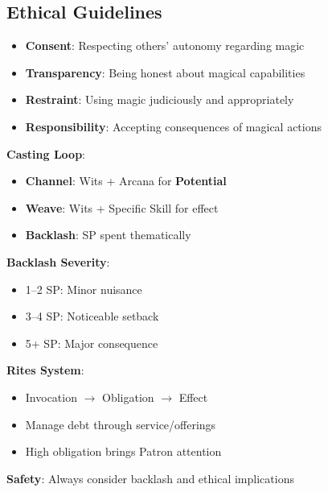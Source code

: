 \begin{multicols}{2}
\subsection*{Ethical Guidelines}
\begin{itemize}
\item \textbf{Consent}: Respecting others' autonomy regarding magic
\item \textbf{Transparency}: Being honest about magical capabilities
\item \textbf{Restraint}: Using magic judiciously and appropriately
\item \textbf{Responsibility}: Accepting consequences of magical actions
\end{itemize}

\begin{tcolorbox}[colback=purple!5!white,colframe=purple!75!black,title=Magic Quick Reference,fonttitle=\bfseries]
\textbf{Casting Loop}:
\begin{itemize}
\item \textbf{Channel}: Wits + Arcana for \textbf{Potential}
\item \textbf{Weave}: Wits + Specific Skill for effect
\item \textbf{Backlash}: SP spent thematically
\end{itemize}

\textbf{Backlash Severity}:
\begin{itemize}
\item 1--2 SP: Minor nuisance
\item 3--4 SP: Noticeable setback
\item 5+ SP: Major consequence
\end{itemize}

\textbf{Rites System}:
\begin{itemize}
\item Invocation $\rightarrow$ Obligation $\rightarrow$ Effect
\item Manage debt through service/offerings
\item High obligation brings Patron attention
\end{itemize}

\textbf{Safety}: Always consider backlash and ethical implications
\end{tcolorbox}


\end{multicols}
